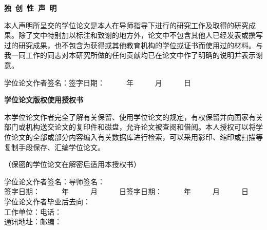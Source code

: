 \begin{titlepage}
\begin{center}
    \song\textbf{独~创~性~声~明}
\end{center}
\par 本人声明所呈交的学位论文是本人在导师指导下进行的研究工作及取得的研究成果。除了文中特别加以标注和致谢的地方外，论文中不包含其他人已经发表或撰写过的研究成果，也不包含为获得\song 或其他教育机构的学位或证书而使用过的材料。与我一同工作的同志对本研究所做的任何贡献均已在论文中作了明确的说明并表示谢意。\\[25pt]
\par 学位论文作者签名：\hspace{115pt}签字日期：~~~~~~年~~~~~~月~~~~~~日\\[25pt]
\begin{center}
    \song{}\textbf{学位论文版权使用授权书}
\end{center}
\par 本学位论文作者完全了解\song 有关保留、使用学位论文的规定，有权保留并向国家有关部门或机构送交论文的复印件和磁盘，允许论文被查阅和借阅。本人授权\song 可以将学位论文的全部或部分内容编入有关数据库进行检索，可以采用影印、缩印或扫描等复制手段保存、汇编学位论文。
\par （保密的学位论文在解密后适用本授权书）\\[25pt]
\begin{flushleft}
学位论文作者签名：\hspace{135pt}导师签名：\\
签字日期：~~~~~~年~~~~~~月~~~~~~日\hspace{95pt}签字日期：~~~~~~年~~~~~~月~~~~~~日\\
学位论文作者毕业后去向：\\
工作单位：\hspace{185pt}电话：\\
通讯地址：\hspace{185pt}邮编：\\
\end{flushleft}
\end{titlepage}
\thispagestyle{empty}
